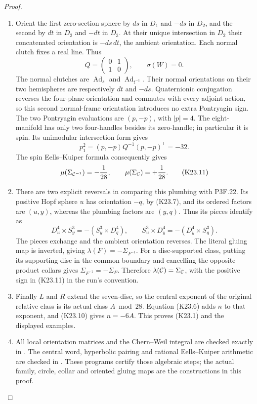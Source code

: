\begin{proof}
\begin{enumerate}[label=\arabic*.]
\item Orient the first zero-section sphere by \(ds\) in \(D_1\) and
\(-ds\) in \(D_2\), and the second by \(dt\) in \(D_2\) and
\(-dt\) in \(D_3\). At their unique intersection in \(D_2\) their
concatenated orientation is \(-ds\,dt\), the ambient orientation.
Each normal clutch fixes a real line. Thus
\[
 Q=\begin{pmatrix}0&1\\1&0\end{pmatrix},\qquad \sigma(W)=0.
\]
The normal clutches are \(\operatorname{Ad}_s\) and
\(\operatorname{Ad}_{t^{-1}}\). Their normal orientations on their
two hemispheres are respectively \(dt\) and \(-ds\).
Quaternionic conjugation reverses the four-plane orientation and
commutes with every adjoint action, so this second normal-frame
orientation introduces no extra Pontryagin sign. The two
Pontryagin evaluations are \((p,-p)\), with \(|p|=4\).
The eight-manifold has only two four-handles besides its zero-handle;
in particular it is spin. Its unimodular intersection form gives
\[
 p_1^2=(p,-p)Q^{-1}(p,-p)^{\mathsf T}=-32.
\]
The spin Eells--Kuiper formula consequently gives
\[
 \mu(\Sigma_{{\cal C}^{-1}})=-\frac1{28},\qquad
 \mu(\Sigma_{\cal C})=+\frac1{28}.                   \tag{K23.11}
\]

\item There are two explicit reversals in comparing this plumbing with
P3F.22. Its positive Hopf sphere \(u\) has orientation \(-q\),
by (K23.7), and its ordered factors are \((u,y)\), whereas the
plumbing factors are \((y,q)\). Thus its pieces identify as
\[
 D^4_u\times S^3_y=-(S^3_y\times D^4_q),\qquad
 S^3_u\times D^4_y=-(D^4_y\times S^3_q).
\]
The pieces exchange and the ambient orientation reverses. The
literal gluing map is inverted, giving
\(\lambda(F)=-\Sigma_{F^{-1}}\). For a disc-supported class,
putting its supporting disc in the common boundary and cancelling
the opposite product collars gives
\(\Sigma_{F^{-1}}=-\Sigma_F\). Therefore
\(\lambda({\cal C})=\Sigma_{\cal C}\), with the positive sign
in (K23.11) in the run's convention.

\item Finally \(L\) and \(R\) extend the seven-disc, so the central exponent
of the original relative class is its actual class \(A\bmod28\).
Equation (K23.6) adds \(n\) to that exponent, and (K23.10) gives
\(n=-6A\). This proves (K23.1) and the displayed examples.

\item All local orientation matrices and the Chern--Weil integral are
checked exactly in . The
central word, hyperbolic pairing and rational Eells--Kuiper
arithmetic are checked in .
These programs certify those algebraic steps; the actual family,
circle, collar and oriented gluing maps are the constructions in
this proof.

\end{enumerate}
\end{proof}
